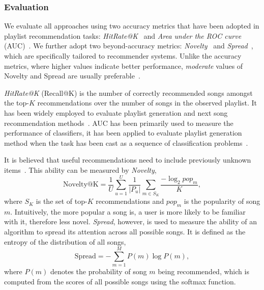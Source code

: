 \subsubsection{Evaluation}

We evaluate %
all approaches using two accuracy metrics that have been adopted 
in playlist recommendation tasks:
\emph{HitRate@K}~\cite{hariri2012context} and \emph{Area under the ROC curve} (AUC)~\cite{manning2008introIR}.
We further adopt two beyond-accuracy metrics: %
\emph{Novelty}~\cite{zhang2012auralist,schedl2017} and \emph{Spread}~\cite{kluver2014evaluating},
which are specifically tailored to recommender systems.
Unlike the accuracy metrics, where higher values indicate better performance,
\emph{moderate} values of Novelty and Spread are usually preferable~\cite{kluver2014evaluating,schedl2017}.
%

\emph{HitRate@K} (\ie Recall@K) 
is the number of correctly recommended songs amongst the top-$K$ recommendations over
the number of songs in the %
observed playlist.
It has been widely employed to evaluate %
playlist generation and next song recommendation
methods~\cite{hariri2012context,bonnin2013evaluating,bonnin2015automated,jannach2015beyond}.
%
AUC has been primarily used to measure the performance of classifiers,
it has been applied to evaluate %
playlist generation method when the task
has been cast as a sequence of classification problems~\cite{ben2017groove}.

It is believed that
useful recommendations need to include previously unknown items~\cite{herlocker2004evaluating,zhang2012auralist}.
This ability can be measured by \emph{Novelty},
$$
\text{Novelty@K} = \frac{1}{U} \sum_{u=1}^U \frac{1}{|P_u|} \sum_{m \in S_K} \frac{-\log_2 pop_m}{K},
$$
where $S_K$ is the set of top-$K$ recommendations and $pop_m$ is the popularity of song $m$.
Intuitively, the more popular a song is, 
a user is more likely to be familiar with it,
therefore less novel. %
%
\emph{Spread}, however, is used to measure the ability of an algorithm to spread its attention across all possible songs.
It is defined as the entropy of the distribution of all songs, %
$$
\text{Spread} = -\sum_{m=1}^M P(m) \log P(m),
$$
where $P(m)$ denotes the probability of song $m$ being recommended,
which is computed from the scores of all possible songs using the softmax function.



